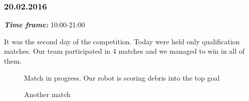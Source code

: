 \subsubsection{20.02.2016}
\textit{\textbf{Time frame:}} 10:00-21:00 

It was the second day of the competition. Today were held only qualification matches. Our team participated in 4 matches and we managed to win in all of them.

\begin{figure}[H]
	\begin{minipage}[h]{0.47\linewidth}
		\caption{Match in progress. Our robot is scoring debris into the top goal}
	\end{minipage}
	\hfill
	\begin{minipage}[h]{0.47\linewidth}
		\caption{Another match}
	\end{minipage}
\end{figure}
